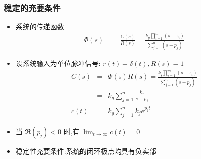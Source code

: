 \documentclass{article}
\begin{document}
\begin{frame}
\frametitle{稳定的充要条件}
\label{sec-2-1-2}


\begin{itemize}
\item 系统的传递函数
      \begin{eqnarray*}
      \Phi(s) & = & \frac{C(s)}{R(s)} = \frac{k_{g}\prod_{i=1}^{m}(s-z_{i})}{\sum_{j=1}^{n}(s-p_{j})} 
      \end{eqnarray*}
\item 设系统输入为单位脉冲信号: $r(t)=\delta(t),R(s)=1$
      \begin{eqnarray*}
      C(s) & = & \Phi(s)R(s) =  \frac{k_{g}\prod_{i=1}^{m}(s-z_{i})}{\sum_{j=1}^{n}(s-p_{j})} \\
	   & = &  k_{g}\sum_{j=1}^{n}\frac{k_{j}}{s-p_{j}} \\
      c(t) & = & k_{g}\sum_{j=1}^{n}k_{j}e^{p_{j}t}
      \end{eqnarray*}
\item 当 $\Re(p_{j})<0$ 时,有 $\lim_{t\rightarrow\infty}c(t) = 0$
\item 稳定性充要条件:系统的闭环极点均具有负实部
\end{itemize}
\end{frame}
\end{document}
